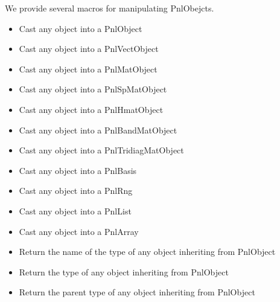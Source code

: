 We provide several macros for manipulating PnlObejcts.
\begin{itemize}
\item {}
  \sshortdescribe Cast any object into a PnlObject

\item {}
  \sshortdescribe Cast any object into a PnlVectObject

\item {}
  \sshortdescribe Cast any object into a PnlMatObject

\item {}
  \sshortdescribe Cast any object into a PnlSpMatObject

\item {}
  \sshortdescribe Cast any object into a PnlHmatObject

\item {}
  \sshortdescribe Cast any object into a PnlBandMatObject

\item {}
  \sshortdescribe Cast any object into a PnlTridiagMatObject

\item {}
  \sshortdescribe Cast any object into a PnlBasis

\item {}
  \sshortdescribe Cast any object into a PnlRng

\item {}
  \sshortdescribe Cast any object into a PnlList

\item {}
  \sshortdescribe Cast any object into a PnlArray

\item {}
  \sshortdescribe Return the name of the type of any object inheriting from PnlObject

\item {}
  \sshortdescribe Return the type of any object inheriting from PnlObject
  
\item {}
  \sshortdescribe Return the parent type of any object inheriting from PnlObject
\end{itemize}

